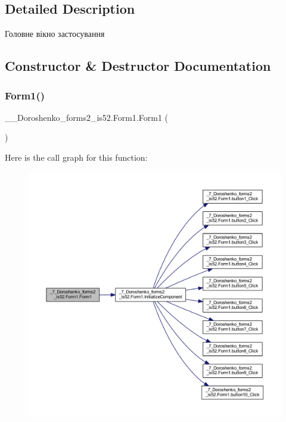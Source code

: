 \subsection{Detailed Description}
Головне вікно застосування 



\subsection{Constructor \& Destructor Documentation}
\hypertarget{class__7___doroshenko__forms2__is52_1_1_form1_a66d5ff09b3dc106a9b16fbc07c4033a4}{}\label{class__7___doroshenko__forms2__is52_1_1_form1_a66d5ff09b3dc106a9b16fbc07c4033a4} 
\subsubsection{\texorpdfstring{Form1()}{Form1()}}
{\footnotesize\ttfamily \+\_\+\_\+\+Doroshenko\+\_\+forms2\+\_\+is52.\+Form1.\+Form1 (\begin{DoxyParamCaption}{ }\end{DoxyParamCaption})}

Here is the call graph for this function\+:
\nopagebreak
\begin{figure}[H]
\begin{center}
\leavevmode
\includegraphics[width=350pt]{class__7___doroshenko__forms2__is52_1_1_form1_a66d5ff09b3dc106a9b16fbc07c4033a4_cgraph}
\end{center}
\end{figure}


